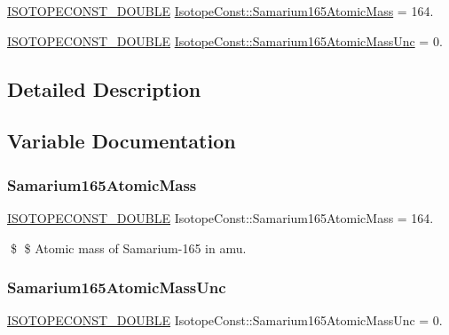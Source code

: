 \begin{DoxyCompactItemize}
\item 
\mbox{\hyperlink{group___isotope_const-_macros_ga8f45a7272ce02c0b4c65c44636ed719a}{I\+S\+O\+T\+O\+P\+E\+C\+O\+N\+S\+T\+\_\+\+D\+O\+U\+B\+LE}} \mbox{\hyperlink{group___isotope_const-_samarium-_sm165_ga83821ed080fa9ac2a7ee5f5dbcf99cc2}{Isotope\+Const\+::\+Samarium165\+Atomic\+Mass}} = 164.
\item 
\mbox{\hyperlink{group___isotope_const-_macros_ga8f45a7272ce02c0b4c65c44636ed719a}{I\+S\+O\+T\+O\+P\+E\+C\+O\+N\+S\+T\+\_\+\+D\+O\+U\+B\+LE}} \mbox{\hyperlink{group___isotope_const-_samarium-_sm165_ga3c5765696db61e00836868b15b3a2bef}{Isotope\+Const\+::\+Samarium165\+Atomic\+Mass\+Unc}} = 0.
\end{DoxyCompactItemize}


\subsection{Detailed Description}


\subsection{Variable Documentation}
\mbox{\label{group___isotope_const-_samarium-_sm165_ga83821ed080fa9ac2a7ee5f5dbcf99cc2}} 
\subsubsection{\texorpdfstring{Samarium165\+Atomic\+Mass}{Samarium165AtomicMass}}
{\footnotesize\ttfamily \mbox{\hyperlink{group___isotope_const-_macros_ga8f45a7272ce02c0b4c65c44636ed719a}{I\+S\+O\+T\+O\+P\+E\+C\+O\+N\+S\+T\+\_\+\+D\+O\+U\+B\+LE}} Isotope\+Const\+::\+Samarium165\+Atomic\+Mass = 164.}

\$ \$ Atomic mass of Samarium-\/165 in amu. \mbox{\label{group___isotope_const-_samarium-_sm165_ga3c5765696db61e00836868b15b3a2bef}} 
\subsubsection{\texorpdfstring{Samarium165\+Atomic\+Mass\+Unc}{Samarium165AtomicMassUnc}}
{\footnotesize\ttfamily \mbox{\hyperlink{group___isotope_const-_macros_ga8f45a7272ce02c0b4c65c44636ed719a}{I\+S\+O\+T\+O\+P\+E\+C\+O\+N\+S\+T\+\_\+\+D\+O\+U\+B\+LE}} Isotope\+Const\+::\+Samarium165\+Atomic\+Mass\+Unc = 0.}

